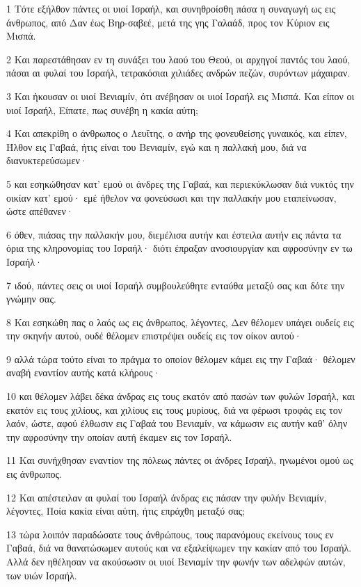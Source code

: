 \par 1 Τότε εξήλθον πάντες οι υιοί Ισραήλ, και συνηθροίσθη πάσα η συναγωγή ως εις άνθρωπος, από Δαν έως Βηρ-σαβεέ, μετά της γης Γαλαάδ, προς τον Κύριον εις Μισπά.
\par 2 Και παρεστάθησαν εν τη συνάξει του λαού του Θεού, οι αρχηγοί παντός του λαού, πάσαι αι φυλαί του Ισραήλ, τετρακόσιαι χιλιάδες ανδρών πεζών, συρόντων μάχαιραν.
\par 3 Και ήκουσαν οι υιοί Βενιαμίν, ότι ανέβησαν οι υιοί Ισραήλ εις Μισπά. Και είπον οι υιοί Ισραήλ, Είπατε, πως συνέβη η κακία αύτη;
\par 4 Και απεκρίθη ο άνθρωπος ο Λευΐτης, ο ανήρ της φονευθείσης γυναικός, και είπεν, Ήλθον εις Γαβαά, ήτις είναι του Βενιαμίν, εγώ και η παλλακή μου, διά να διανυκτερεύσωμεν·
\par 5 και εσηκώθησαν κατ' εμού οι άνδρες της Γαβαά, και περιεκύκλωσαν διά νυκτός την οικίαν κατ' εμού· εμέ ήθελον να φονεύσωσι και την παλλακήν μου εταπείνωσαν, ώστε απέθανεν·
\par 6 όθεν, πιάσας την παλλακήν μου, διεμέλισα αυτήν και έστειλα αυτήν εις πάντα τα όρια της κληρονομίας του Ισραήλ· διότι έπραξαν ανοσιουργίαν και αφροσύνην εν τω Ισραήλ·
\par 7 ιδού, πάντες σεις οι υιοί Ισραήλ συμβουλεύθητε ενταύθα μεταξύ σας και δότε την γνώμην σας.
\par 8 Και εσηκώθη πας ο λαός ως εις άνθρωπος, λέγοντες, Δεν θέλομεν υπάγει ουδείς εις την σκηνήν αυτού, ουδέ θέλομεν επιστρέψει ουδείς εις τον οίκον αυτού·
\par 9 αλλά τώρα τούτο είναι το πράγμα το οποίον θέλομεν κάμει εις την Γαβαά· θέλομεν αναβή εναντίον αυτής κατά κλήρους·
\par 10 και θέλομεν λάβει δέκα άνδρας εις τους εκατόν από πασών των φυλών Ισραήλ, και εκατόν εις τους χιλίους, και χιλίους εις τους μυρίους, διά να φέρωσι τροφάς εις τον λαόν, ώστε, αφού έλθωσιν εις Γαβαά του Βενιαμίν, να κάμωσιν εις αυτήν καθ' όλην την αφροσύνην την οποίαν αυτή έκαμεν εις τον Ισραήλ.
\par 11 Και συνήχθησαν εναντίον της πόλεως πάντες οι άνδρες Ισραήλ, ηνωμένοι ομού ως εις άνθρωπος.
\par 12 Και απέστειλαν αι φυλαί του Ισραήλ άνδρας εις πάσαν την φυλήν Βενιαμίν, λέγοντες, Ποία κακία είναι αύτη, ήτις επράχθη μεταξύ σας;
\par 13 τώρα λοιπόν παραδώσατε τους άνθρώπους, τους παρανόμους εκείνους τους εν Γαβαά, διά να θανατώσωμεν αυτούς και να εξαλείψωμεν την κακίαν από του Ισραήλ. Αλλά δεν ηθέλησαν να ακούσωσιν οι υιοί Βενιαμίν την φωνήν των αδελφών αυτών, των υιών Ισραήλ.
